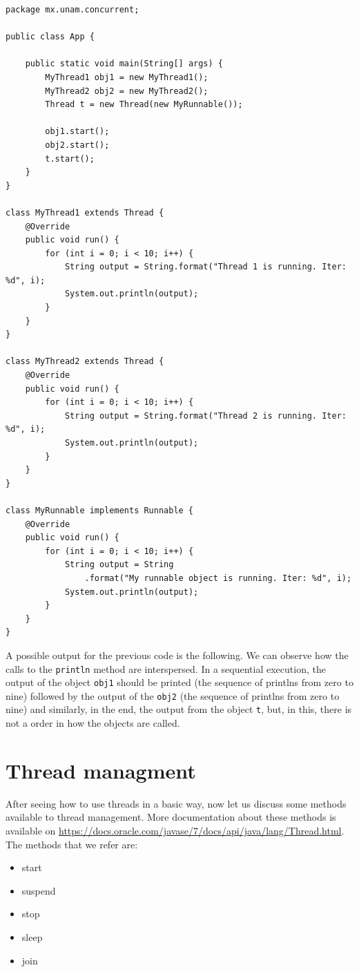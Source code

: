 \documentclass[openany, a4paper]{book}
\theoremstyle{break}
\theoremstyle{example}
\theoremstyle{note}
\theoremstyle{break}
\theoremstyle{exercise}
\begin{document}
\begin{verbatim}
package mx.unam.concurrent;

public class App {

    public static void main(String[] args) {
        MyThread1 obj1 = new MyThread1();
        MyThread2 obj2 = new MyThread2();
        Thread t = new Thread(new MyRunnable());

        obj1.start();
        obj2.start();
        t.start();
    }
}

class MyThread1 extends Thread {
    @Override
    public void run() {
        for (int i = 0; i < 10; i++) {
            String output = String.format("Thread 1 is running. Iter: %d", i);
            System.out.println(output);
        }
    }
}

class MyThread2 extends Thread {
    @Override
    public void run() {
        for (int i = 0; i < 10; i++) {
            String output = String.format("Thread 2 is running. Iter: %d", i);
            System.out.println(output);
        }
    }
}

class MyRunnable implements Runnable {
    @Override
    public void run() {
        for (int i = 0; i < 10; i++) {
            String output = String
                .format("My runnable object is running. Iter: %d", i);
            System.out.println(output);
        }
    }
}
\end{verbatim}

A possible output for the previous code is the following. We can observe how
the calls to the \texttt{println} method are interspersed. In a sequential execution,
the output of the object \texttt{obj1} should be printed (the sequence of printlns
from zero to nine) followed by the output of the \texttt{obj2} (the sequence of
printlns from zero to nine) and similarly, in the end, the output from the
object \texttt{t}, but, in this, there is not a order in how the objects are
called.

\section{Thread managment}
\label{sec:orgd1799b5}

After seeing how to use threads in a basic way, now let us discuss some
methods available to thread management. More documentation about these
methods is available on
\url{https://docs.oracle.com/javase/7/docs/api/java/lang/Thread.html}.
The methods that we refer are:

\begin{itemize}
\item start
\item suspend
\item stop
\item sleep
\item join
\end{itemize}
\end{document}

